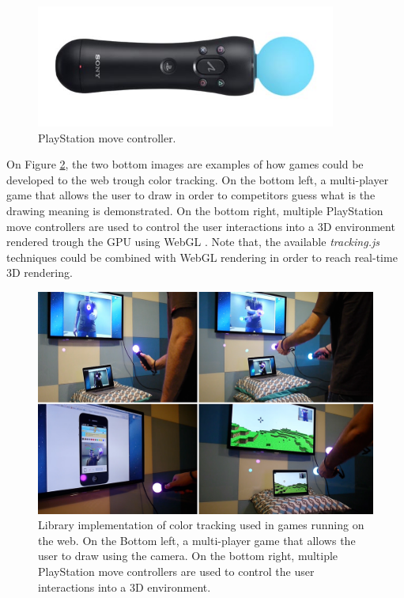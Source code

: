 \begin{figure}[!htb]
  \centering
  \includegraphics[width=280pt]{chapters/evaluation/psmove.png}
  \caption{PlayStation move controller.}
  \label{figure:psmove}
\end{figure}

On Figure \ref{figure:color_games}, the two bottom images are examples of how games could be developed to the web trough color tracking. On the bottom left, a multi-player game that allows the user to draw in order to competitors guess what is the drawing meaning is demonstrated. On the bottom right, multiple PlayStation move controllers are used to control the user interactions into a 3D environment rendered trough the GPU using WebGL \cite{WebGL2013}. Note that, the available \textit{tracking.js} techniques could be combined with WebGL rendering in order to reach real-time 3D rendering.

\begin{figure}[!htb]
  \centering
  \includegraphics[width=\linewidth]{chapters/evaluation/color_games.png}
  \caption{Library implementation of color tracking used in games running on the web. On the Bottom left, a multi-player game that allows the user to draw using the camera. On the bottom right, multiple PlayStation move controllers are used to control the user interactions into a 3D environment.}
  \label{figure:color_games}
\end{figure}

